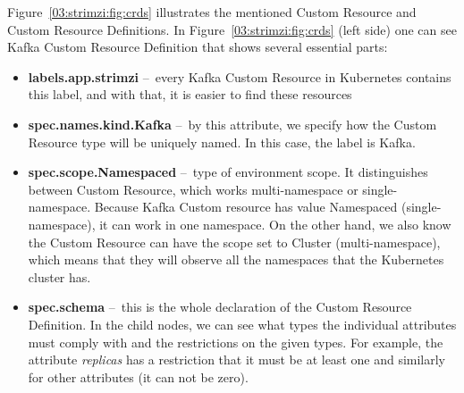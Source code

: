 Figure~\ref{03:strimzi:fig:crds} illustrates the mentioned Custom Resource and Custom Resource Definitions.
In Figure~\ref{03:strimzi:fig:crds} (left side) one can see Kafka Custom Resource Definition that shows several essential parts:
\begin{itemize}[itemsep=1mm, parsep=0pt]
    \item \textbf{labels.app.strimzi}  \---\ every Kafka Custom Resource in Kubernetes contains this label, and with that, it is easier to find these resources
    \item \textbf{spec.names.kind.Kafka} \---\ by this attribute, we specify how the Custom Resource type will be uniquely named.
    In this case, the label is Kafka.
    \item \textbf{spec.scope.Namespaced} \---\ type of environment scope.
    It distinguishes between Custom Resource, which works multi-namespace or single-namespace.
    Because Kafka Custom resource has value Namespaced (single-namespace), it can work in one namespace.
    On the other hand, we also know the Custom Resource can have the scope set to Cluster (multi-namespace), which means that they will observe all the namespaces that the Kubernetes cluster has.
    \item \textbf{spec.schema} \---\ this is the whole declaration of the Custom Resource Definition.
    In the child nodes, we can see what types the individual attributes must comply with and the restrictions on the given types.
    For example, the attribute \emph{replicas} has a restriction that it must be at least one and similarly for other attributes (it can not be zero).
   \end{itemize}


